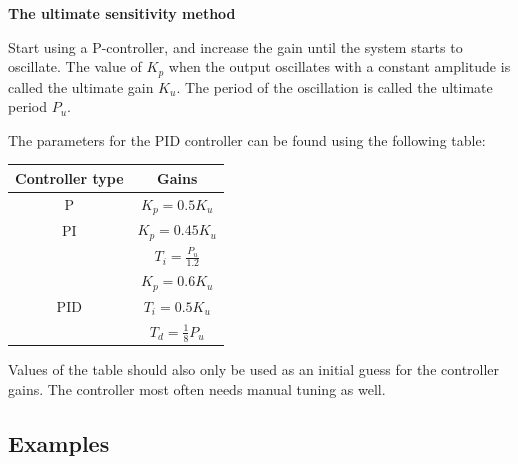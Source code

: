 \textbf{The ultimate sensitivity method}

Start using a P-controller, and increase the gain until the system starts to oscillate.
The value of $K_p$ when the output oscillates with a constant amplitude is called the ultimate gain $K_u$.
The period of the oscillation is called the ultimate period $P_u$.

The parameters for the PID controller can be found using the following table:
\begin{table}[H]
	\centering
	\begin{tabular}{|c|c|}
		\hline
		\cellcolor[HTML]{C0C0C0} \textbf{Controller type} & \cellcolor[HTML]{C0C0C0}\textbf{Gains} \\ \hline
		P                                                 & $K_p=0.5K_u$                           \\ \hline
		PI                                                & $K_p=0.45K_u$                          \\
		                                                  & $T_i=\frac{P_u}{1.2}$                  \\ \hline
		                                                  & $K_p=0.6K_u$                           \\
		PID                                               & $T_i=0.5K_u$                           \\
		                                                  & $T_d=\frac{1}{8}P_u$                   \\ \hline
	\end{tabular}
\end{table}

Values of the table should also only be used as an initial guess for the controller gains.
The controller most often needs manual tuning as well.

\subsection{Examples}
